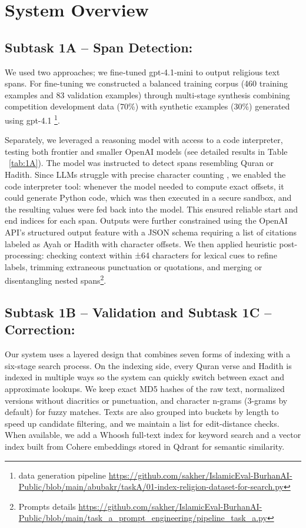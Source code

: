 \documentclass[11pt]{article}
\begin{document}
\section{System Overview }
\subsection{Subtask 1A – Span Detection: }
We used two approaches; we fine‑tuned gpt‑4.1‑mini to output religious text spans. For fine-tuning we constructed a balanced training corpus (460 training examples and 83 validation examples) through multi-stage synthesis combining competition development data (70\%) with synthetic examples (30\%) generated using gpt-4.1 \footnote{ data generation pipeline \url{https://github.com/sakher/IslamicEval-BurhanAI-Public/blob/main/abubakr/taskA/01-index-religion-dataset-for-search.py}}. 

Separately, we leveraged a reasoning model with access to a code interpreter, testing both frontier and smaller OpenAI models (see detailed results in Table ~\ref{tab:1A}). The model was instructed to detect spans resembling Quran or Hadith. Since LLMs struggle with precise character counting \citet{fu2024large}, we enabled the code interpreter tool: whenever the model needed to compute exact offsets, it could generate Python code, which was then executed in a secure sandbox, and the resulting values were fed back into the model. This ensured reliable start and end indices for each span. Outputs were further constrained using the OpenAI API’s structured output feature with a JSON schema requiring a list of citations labeled as Ayah or Hadith with character offsets. We then applied heuristic post-processing: checking context within ±64 characters for lexical cues to refine labels, trimming extraneous punctuation or quotations, and merging or disentangling nested spans\footnote{ Prompts details \url{https://github.com/sakher/IslamicEval-BurhanAI-Public/blob/main/task_a_prompt_engineering/pipeline_task_a.py}}. 

\subsection{Subtask 1B – Validation and Subtask 1C – Correction: } \label{sec: val and corr}
Our system uses a layered design that combines seven forms of indexing with a six-stage search process. On the indexing side, every Quran verse and Hadith is indexed in multiple ways so the system can quickly switch between exact and approximate lookups. We keep exact MD5 hashes of the raw text, normalized versions without diacritics or punctuation, and character n-grams (3-grams by default) for fuzzy matches. Texts are also grouped into buckets by length to speed up candidate filtering, and we maintain a list for edit-distance checks. When available, we add a Whoosh full-text index for keyword search and a vector index built from Cohere embeddings stored in Qdrant for semantic similarity.
\end{document}

